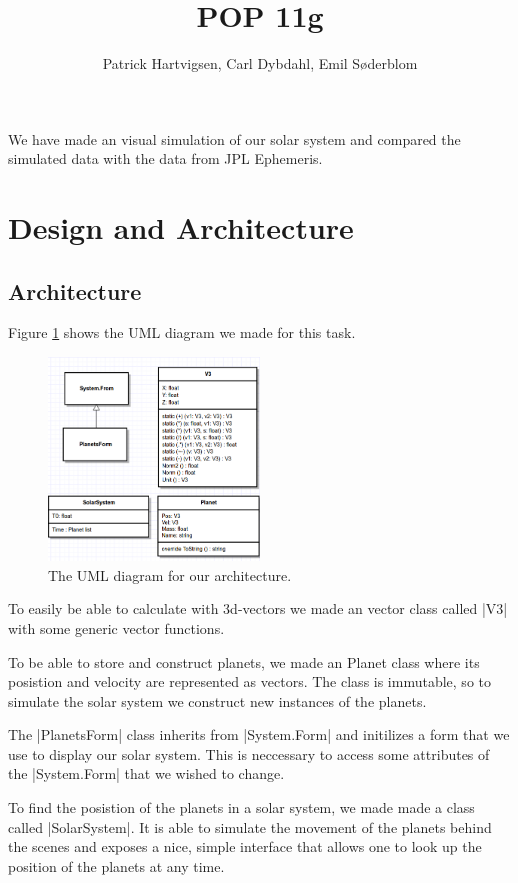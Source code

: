 \documentclass[a4paper]{article}
\title{POP 11g}
\author{Patrick Hartvigsen, Carl Dybdahl, Emil Søderblom}
\begin{document}
\maketitle

We have made an visual simulation of our solar system and compared the simulated data with the data from JPL Ephemeris.

\section{Design and Architecture}

\subsection{Architecture}

Figure \ref{uml} shows the UML diagram we made for this task. 

\begin{figure}[!ht]
\centering
\includegraphics[width=0.5\textwidth]{uml.png}
\caption{The UML diagram for our architecture.}
\label{uml}
\end{figure}

To easily be able to calculate with 3d-vectors we made an vector class called \code|V3| with some generic vector functions.

To be able to store and construct planets, we made an Planet class where its posistion and velocity are represented as vectors. The class is immutable, so to simulate the solar system we construct new instances of the planets.

The \code|PlanetsForm| class inherits from \code|System.Form| and initilizes a form that we use to display our solar system. This is neccessary to access some attributes of the \code|System.Form| that we wished to change.

To find the posistion of the planets in a solar system, we made made a class called \code|SolarSystem|. It is able to simulate the movement of the planets behind the scenes and exposes a nice, simple interface that allows one to look up the position of the planets at any time.
\end{document}
